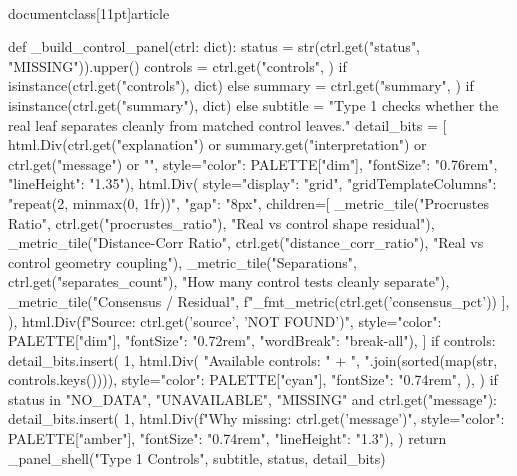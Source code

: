 \\documentclass[11pt]{article}
\begin{document}
\begin{CodeBlock}
{{{{{{{{def _build_control_panel(ctrl: dict):
    status = str(ctrl.get("status", "MISSING")).upper()
    controls = ctrl.get("controls", {}) if isinstance(ctrl.get("controls"), dict) else {}
    summary = ctrl.get("summary", {}) if isinstance(ctrl.get("summary"), dict) else {}
    subtitle = "Type 1 checks whether the real leaf separates cleanly from matched control leaves."
    detail_bits = [
        html.Div(ctrl.get("explanation") or summary.get("interpretation") or ctrl.get("message") or "", style={"color": PALETTE["dim"], "fontSize": "0.76rem", "lineHeight": "1.35"}),
        html.Div(
            style={"display": "grid", "gridTemplateColumns": "repeat(2, minmax(0, 1fr))", "gap": "8px"},
            children=[
                _metric_tile("Procrustes Ratio", ctrl.get("procrustes_ratio"), "Real vs control shape residual"),
                _metric_tile("Distance-Corr Ratio", ctrl.get("distance_corr_ratio"), "Real vs control geometry coupling"),
                _metric_tile("Separations", ctrl.get("separates_count"), "How many control tests cleanly separate"),
                _metric_tile("Consensus / Residual", f"{_fmt_metric(ctrl.get('consensus_pct'))}%
            ],
        ),
        html.Div(f"Source: {ctrl.get('source', 'NOT FOUND')}", style={"color": PALETTE["dim"], "fontSize": "0.72rem", "wordBreak": "break-all"}),
    ]
    if controls:
        detail_bits.insert(
            1,
            html.Div(
                "Available controls: " + ", ".join(sorted(map(str, controls.keys()))),
                style={"color": PALETTE["cyan"], "fontSize": "0.74rem"},
            ),
        )
    if status in {"NO_DATA", "UNAVAILABLE", "MISSING"} and ctrl.get("message"):
        detail_bits.insert(
            1,
            html.Div(f"Why missing: {ctrl.get('message')}", style={"color": PALETTE["amber"], "fontSize": "0.74rem", "lineHeight": "1.3"}),
        )
    return _panel_shell("Type 1 Controls", subtitle, status, detail_bits)


}}}}}}}}
\end{CodeBlock}
\end{document}

